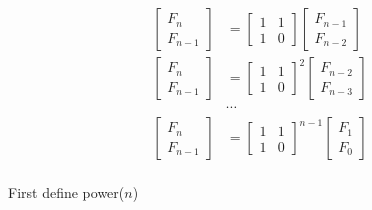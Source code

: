                 \begin{align*}
                    \begin{bmatrix}
                        F_n \\ F_{n - 1}
                    \end{bmatrix} &= \begin{bmatrix}
                        1 & 1 \\ 1 & 0
                    \end{bmatrix} \begin{bmatrix}
                        F_{n - 1} \\ F_{n - 2}
                    \end{bmatrix}\\
                    \begin{bmatrix}
                        F_n \\ F_{n - 1}
                    \end{bmatrix} &= \begin{bmatrix}
                        1 & 1 \\ 1 & 0
                    \end{bmatrix}^2 \begin{bmatrix}
                        F_{n - 2} \\ F_{n - 3}
                    \end{bmatrix}\\
                    &\cdots\\
                    \begin{bmatrix}
                        F_n \\ F_{n - 1}
                    \end{bmatrix} &= \begin{bmatrix}
                        1 & 1 \\ 1 & 0
                    \end{bmatrix}^{n - 1} \begin{bmatrix}
                        F_1 \\ F_0
                    \end{bmatrix}\\
                \end{align*}

                First define power($n$)

